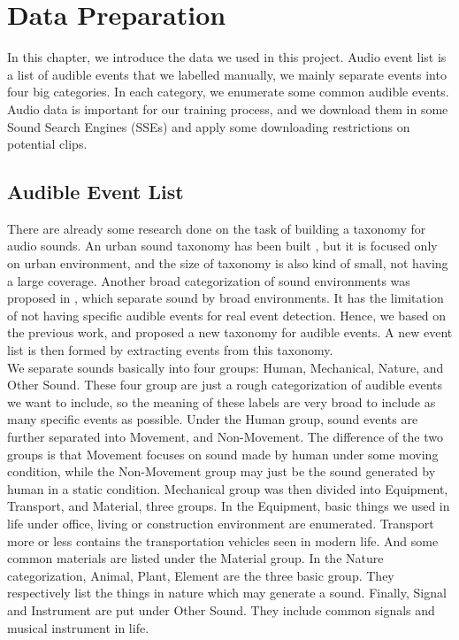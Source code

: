 \chapter{Data Preparation}
In this chapter, we introduce the data we used in this project. 
Audio event list is a list of audible events that we labelled manually, we mainly separate events into four big categories. 
In each category, we enumerate some common audible events. 
Audio data is important for our training process, and we download them in some Sound Search Engines (SSEs) and apply some downloading restrictions on potential clips. 


\section{Audible Event List} 
There are already some research done on the task of building a taxonomy for audio sounds. 
An urban sound taxonomy has been built \cite{salamon2014dataset}, but it is focused only on urban environment, and the size of taxonomy is also kind of small, not having a large coverage. 
Another broad categorization of sound environments was proposed in \cite{brown2011towards}, which separate sound by broad environments. 
It has the limitation of not having specific audible events for real event detection. 
Hence, we based on the previous work, and proposed a new taxonomy for audible events. 
A new event list is then formed by extracting events from this taxonomy.  \\ 

We separate sounds basically into four groups: Human, Mechanical, Nature, and Other Sound. 
These four group are just a rough categorization of audible events we want to include, so the meaning of these labels are very broad to include as many specific events as possible. 
Under the Human group, sound events are further separated into Movement, and Non-Movement. 
The difference of the two groups is that Movement focuses on sound made by human under some moving condition, while the Non-Movement group may just be the sound generated by human in a static condition.
Mechanical group was then divided into Equipment, Transport, and Material, three groups. 
In the Equipment, basic things we used in life under office, living or construction environment are enumerated. 
Transport more or less contains the transportation vehicles seen in modern life. 
And some common materials are listed under the Material group. 
In the Nature categorization, Animal, Plant, Element are the three basic group. 
They respectively list the things in nature which may generate a sound. 
Finally, Signal and Instrument are put under Other Sound. 
They include common signals and musical instrument in life. 

